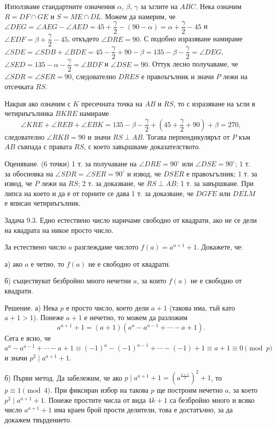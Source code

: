 Използваме стандартните означения $\alpha$, $\beta$, $\gamma$ за ъглите на $ABC$. Нека означим $R=DF\cap GE$ и $S=ME\cap DL$. Можем да намерим, че $\angle DEG=\angle AEG-\angle AED=45+\dfrac\gamma2-(90-\alpha)=\alpha+\dfrac\gamma2-45$ и $\angle EDF=\beta+\dfrac\gamma2-45$, откъдето $\angle DRE=90$. С подобно изразяване намираме $\angle SDE=\angle SDB+\angle BDE=45-\dfrac\gamma2+90-\beta=135-\beta-\dfrac\gamma2=\angle DEG$, $\angle SED=135-\alpha-\dfrac\gamma2=\angle BDF$ и $\angle DSE=90$. Оттук лесно получаваме, че $\angle SDR=\angle SER=90$, следователно $DRES$ е правоъгълник и значи $P$ лежи на отсечката $RS$.

Накрая ако означим с $K$ пресечната точка на $AB$ и $RS$, то с изразяване на ъгли в четириъгълника $BKRE$ намираме
$$
\angle KRE+\angle REB+\angle EBK=135-\beta-\frac\gamma2+\left(45+\frac\gamma2+90\right)+\beta=270,
$$
следователно $\angle RKB=90$ и значи $RS\perp AB$. Тогава перпендикулярът от $P$ към $AB$ съвпада с правата $RS$, с което завършваме доказателството.

Оценяване. (6 точки) 1 т. за получаване на $\angle DRE=90^\circ$ или $\angle DSE=90^\circ$; 1 т. за обосновка на $\angle SDR=\angle SER=90^\circ$ и извод, че $DSER$ е правоъгълник; 1 т. за извод, че $P$ лежи на $RS$; 2 т. за доказване, че $RS\perp AB$; 1 т. за завършване. При липса на което и да е от горните се дава 1 т. за доказване, че $DGFE$ или $DELM$ е вписан четириъгълник.

Задача 9.3. Едно естествено число наричаме свободно от квадрати, ако не се дели на квадрата на никое просто число.

За естествено число $a$ разглеждаме числото $f(a)=a^{a+1}+1$. Докажете, че:

а) ако $a$ е четно, то $f(a)$ не е свободно от квадрати.

б) съществуват безбройно много нечетни $a$, за които $f(a)$ не е свободно от квадрати.

Решение. а) Нека $p$ е просто число, което дели $a+1$ (такова има, тъй като $a+1>1$). Понеже $a+1$ е нечетно, то можем да разложим
$$
a^{a+1}+1=(a+1)(a^a-a^{a-1}+\cdots-a+1).
$$
Сега е ясно, че $a^a-a^{a-1}+\cdots-a+1\equiv(-1)^a-(-1)^{a-1}+\cdots-(-1)+1\equiv a+1\equiv0\pmod p$ и значи $p^2\mid a^{a+1}+1$.

б) Първи метод. Да забележим, че ако $p\mid a^{a+1}+1=\left(a^{\frac{a+1}{2}}\right)^2+1$, то $p\equiv1\pmod4$. При фиксиран избор на такова $p$ ще построим нечетно $a$, за което $p^2\mid a^{a+1}+1$. Понеже простите числа от вида $4k+1$ са безбройно много и всяко число $a^{a+1}+1$ има краен брой прости делители, това е достатъчно, за да докажем твърдението.

